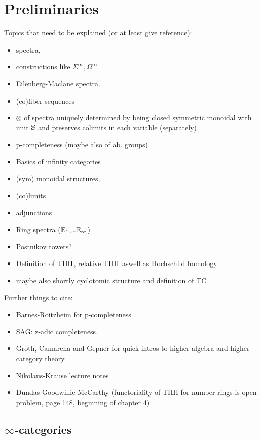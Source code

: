 \chapter{Preliminaries}
Topics that need to be explained (or at least give reference):
\begin{itemize}
    \item spectra, 
    \item constructions like $\Sigma^\infty,\Omega^\infty$ 
    \item Eilenberg-Maclane spectra.
    \item (co)fiber sequences
    \item $\otimes$ of spectra uniquely determined by being closed symmetric monoidal with unit $\S$ and preserves colimits in each variable (separately)
    \item p-completeness (maybe also of ab. groups)
    \item Basics of infinity categories
    \item (sym) monoidal structures, 
    \item (co)limits
    \item adjunctions
    \item Ring spectra ($\Eone$,\dots $\Einf$)
    \item Postnikov towers?
    \item Definition of $\THH$, relative $\THH$ aswell as Hochschild homology
    \item maybe also shortly cyclotomic structure and definition of $\TC$
\end{itemize}

Further things to cite:
\begin{itemize}
    \item Barnes-Roitzheim for p-completeness
    \item SAG: z-adic completeness.
    \item Groth, Camarena and Gepner for quick intros to higher algebra and higher category theory.
    \item Nikolaus-Krause lecture notes 
    \item Dundas-Goodwillie-McCarthy (functoriality of THH for number rings is open problem, page 148, beginning of chapter 4)
\end{itemize}
\section{$\infty$-categories}
